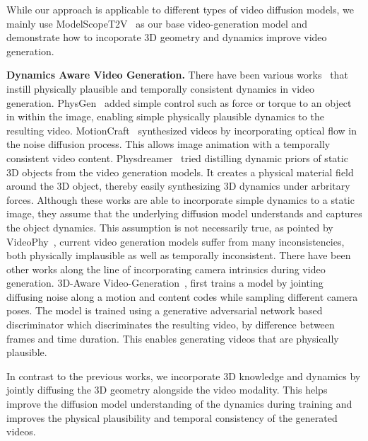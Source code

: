 While our approach is applicable to different types of video diffusion models, we mainly use ModelScopeT2V~\cite{wang2023modelscope} as our base video-generation model and demonstrate how to incoporate 3D geometry and dynamics improve video generation.

\noindent\textbf{Dynamics Aware Video Generation.} There have been various works~\cite{savantaira2024motioncraft,liu2024physgen,zhang2024physdreamer} that instill physically plausible and temporally consistent dynamics in video generation. PhysGen~\cite{liu2024physgen} added simple control such as force or torque to an object in within the image, enabling simple physically plausible dynamics to the resulting video. MotionCraft~\cite{savantaira2024motioncraft} synthesized videos by incorporating optical flow in the noise diffusion process. This allows image animation with a temporally consistent video content. Physdreamer~\cite{zhang2024physdreamer} tried distilling dynamic priors of static 3D objects from the video generation models. It creates a physical material field around the 3D object, thereby easily synthesizing 3D dynamics under arbritary forces. Although these works are able to incorporate simple dynamics to a static image, they assume that the underlying diffusion model understands and captures the object dynamics. This assumption is not necessarily true, as pointed by VideoPhy~\cite{bansal2024videophy}, current video generation models suffer from many inconsistencies, both physically implausible as well as temporally inconsistent. There have been other works along the line of incorporating camera intrinsics during video generation. 3D-Aware Video-Generation~\cite{bahmani20233dawarevideogeneration}, first trains a model by jointing diffusing noise along a motion and content codes while sampling different camera poses. The model is trained using a generative adversarial network based discriminator which discriminates the resulting video, by difference between frames and time duration. This enables generating videos that are physically plausible. 


In contrast to the previous works, we incorporate 3D knowledge and dynamics by jointly diffusing the 3D geometry alongside the video modality. This helps improve the diffusion model understanding of the dynamics during training and improves the physical plausibility and temporal consistency of the generated videos. 


